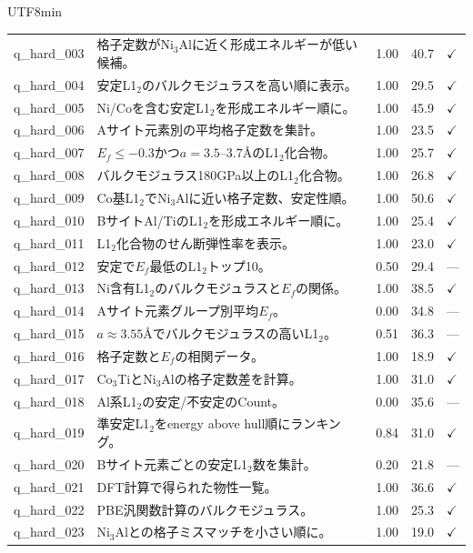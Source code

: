 \documentclass[sn-mathphys,Numbered]{sn-jnl}
\begin{document}
\begin{CJK}{UTF8}{min}
\begin{longtable}{lp{8.5cm}ccl}
    q\_hard\_003 & 格子定数がNi$_3$Alに近く形成エネルギーが低い候補。 & 1.00 & 40.7 & $\checkmark$ \\
    q\_hard\_004 & 安定L1$_2$のバルクモジュラスを高い順に表示。 & 1.00 & 29.5 & $\checkmark$ \\
    q\_hard\_005 & Ni/Coを含む安定L1$_2$を形成エネルギー順に。 & 1.00 & 45.9 & $\checkmark$ \\
    q\_hard\_006 & Aサイト元素別の平均格子定数を集計。 & 1.00 & 23.5 & $\checkmark$ \\
    q\_hard\_007 & $E_f \leq -0.3$かつ$a = 3.5$--$3.7$\AA のL1$_2$化合物。 & 1.00 & 25.7 & $\checkmark$ \\
    q\_hard\_008 & バルクモジュラス180GPa以上のL1$_2$化合物。 & 1.00 & 26.8 & $\checkmark$ \\
    q\_hard\_009 & Co基L1$_2$でNi$_3$Alに近い格子定数、安定性順。 & 1.00 & 50.6 & $\checkmark$ \\
    q\_hard\_010 & BサイトAl/TiのL1$_2$を形成エネルギー順に。 & 1.00 & 25.4 & $\checkmark$ \\
    q\_hard\_011 & L1$_2$化合物のせん断弾性率を表示。 & 1.00 & 23.0 & $\checkmark$ \\
    q\_hard\_012 & 安定で$E_f$最低のL1$_2$トップ10。 & 0.50 & 29.4 & --- \\
    q\_hard\_013 & Ni含有L1$_2$のバルクモジュラスと$E_f$の関係。 & 1.00 & 38.5 & $\checkmark$ \\
    q\_hard\_014 & Aサイト元素グループ別平均$E_f$。 & 0.00 & 34.8 & --- \\
    q\_hard\_015 & $a \approx 3.55$\AA でバルクモジュラスの高いL1$_2$。 & 0.51 & 36.3 & --- \\
    q\_hard\_016 & 格子定数と$E_f$の相関データ。 & 1.00 & 18.9 & $\checkmark$ \\
    q\_hard\_017 & Co$_3$TiとNi$_3$Alの格子定数差を計算。 & 1.00 & 31.0 & $\checkmark$ \\
    q\_hard\_018 & Al系L1$_2$の安定/不安定のCount。 & 0.00 & 35.6 & --- \\
    q\_hard\_019 & 準安定L1$_2$をenergy above hull順にランキング。 & 0.84 & 31.0 & $\checkmark$ \\
    q\_hard\_020 & Bサイト元素ごとの安定L1$_2$数を集計。 & 0.20 & 21.8 & --- \\
    q\_hard\_021 & DFT計算で得られた物性一覧。 & 1.00 & 36.6 & $\checkmark$ \\
    q\_hard\_022 & PBE汎関数計算のバルクモジュラス。 & 1.00 & 25.3 & $\checkmark$ \\
    q\_hard\_023 & Ni$_3$Alとの格子ミスマッチを小さい順に。 & 1.00 & 19.0 & $\checkmark$ \\

\end{longtable}
\end{CJK}
\end{document}
